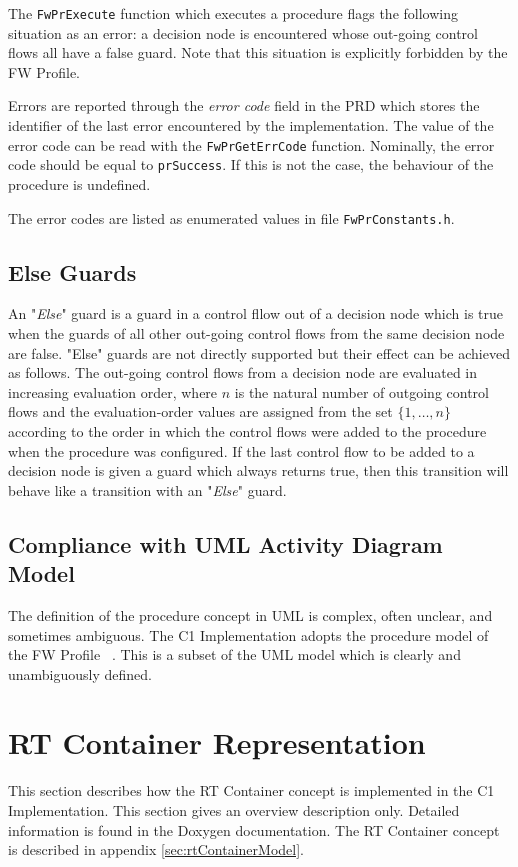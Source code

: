 \documentclass[manual]{../fwprofile}
\begin{document}
The \texttt{FwPrExecute} function which executes a procedure flags the following situation as an error:
a decision node is encountered whose out-going control flows all have a false guard.
Note that this situation is explicitly forbidden by the FW Profile.

Errors are reported through the \emph{error code} field in the PRD which stores the identifier of the last 
error encountered by the implementation. The value of the error code can be read with the \texttt{FwPrGetErrCode} 
function. Nominally, the error code should be equal to \texttt{prSuccess}. If this is not the case, the behaviour 
of the procedure is undefined.

The error codes are listed as enumerated values in file \texttt{FwPrConstants.h}.

\subsection{Else Guards}
An "\emph{Else}" guard is a guard in a control fllow out of a decision node which is true when the guards of 
all other out-going control flows from the same decision node are false. "Else" guards are not directly 
supported but their effect can be achieved as follows. The out-going control flows from a decision node
are evaluated in increasing evaluation order, where $n$ is the natural number of outgoing control flows and the evaluation-order values are assigned
from the set $\{1,\ldots,n\}$ according to the order in which the control flows were added to the procedure when the procedure was configured.
If the last control flow to be added 
to a decision node is given a guard which always returns true, then this transition will behave like 
a transition with an "\emph{Else}" guard.

\subsection{Compliance with UML Activity Diagram Model}
The definition of the procedure concept in UML is complex, often unclear, and sometimes ambiguous. 
The C1 Implementation adopts the procedure model of the FW Profile ~\cite{ref:fwprofile}. 
This is a subset of the UML model which is clearly and unambiguously defined. 

\section{RT Container Representation}
This section describes how the RT Container concept is implemented in the C1 Implementation. This section gives an overview description only. Detailed information is found in the Doxygen documentation. The RT Container concept is described in appendix \ref{sec:rtContainerModel}.
\end{document}
